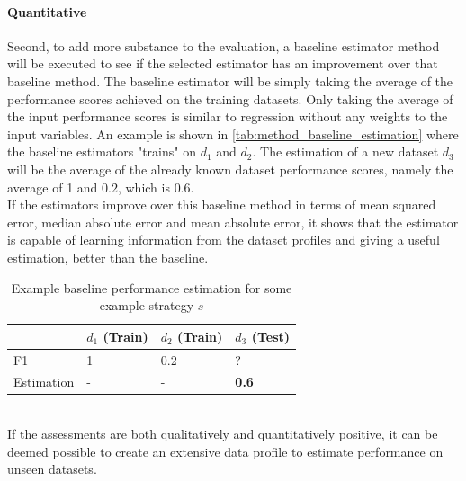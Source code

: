 \paragraph{Quantitative} Second, to add more substance to the evaluation, a baseline estimator method will be executed to see if the selected estimator has an improvement over that baseline method. The baseline estimator will be simply taking the average of the performance scores achieved on the training datasets. Only taking the average of the input performance scores is similar to regression without any weights to the input variables.
An example is shown in \autoref{tab:method_baseline_estimation} where the baseline estimators "trains" on $d_1$ and $d_2$. The estimation of a new dataset $d_3$ will be the average of the already known dataset performance scores, namely the average of 1 and $0.2$, which is $0.6$.
\\If the estimators improve over this baseline method in terms of mean squared error, median absolute error and mean absolute error, it shows that the estimator is capable of learning information from the dataset profiles and giving a useful estimation, better than the baseline.

\begin{table}[]
\centering
\begin{tabular}{l|lll}
           & $d_1$ (Train) & $d_2$ (Train) & $d_3$ (Test) \\ \hline
F1         & 1             & 0.2             & ?            \\
Estimation & -             & -             & \textbf{0.6}
\end{tabular}
\caption{Example baseline performance estimation for some example strategy $s$}
\label{tab:method_baseline_estimation}
\end{table}

~\\If the assessments are both qualitatively and quantitatively positive, it can be deemed possible to create an extensive data profile to estimate performance on unseen datasets.